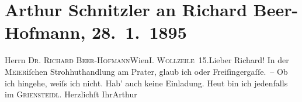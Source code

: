 

         
         \renewcommand{\erwaehntePersonen}{Personen: Richard Beer-Hofmann}
         \renewcommand{\erwaehnteInstitutionen}{Institutionen: I. Mayer Strohhüte}
         \renewcommand{\erwaehnteOrte}{Orte: Café Griensteidl, Freisingergasse, I., Innere Stadt, IX., Alsergrund, Prater, Wien, Wollzeile}
         \renewcommand{\erwaehnteWerke}{}
               \section[Arthur Schnitzler an Richard Beer-Hofmann, 28. 1. 1895]{ Arthur Schnitzler an Richard Beer-Hofmann, 28. 1. 1895}\nopagebreak{}\rehead{ }\begin{ledgroupsized}[t]{13cm}\normalsize\beginnumbering \toendnotes[C]{\smallbreak\pagebreak[2]} 
\pstart{}{\pb}Herrn \textsc{Dr. Richard
                     Beer-Hofmann}\pend{}\pstart{}Wien\pend{}\pstart{}\textsc{I. Wollzeile 15}.\pend{}{\bigskip}\pstart{}{\pb}Lieber Richard!\pend\pstart
           In der \textsc{Meier}iſchen Strohhuthandlung am Prater, glaub ich oder Freiſingergaſſe. –\pend
           \pstart
           Ob ich hingehe, weiſs ich nicht. Hab’ auch keine Einladung. Heut bin ich jedenfalls
               im \textsc{Griensteidl}.\pend
           \pstart Herzlichſt Ihr\spacefill\mbox{Arthur}\pend{}
         
         \endnumbering{}\end{ledgroupsized}  \newcommand{\dateiname}{L00417}\newcommand{\titel}{Arthur Schnitzler an Richard Beer-Hofmann, 28. 1. 1895}\newcommand{\editorInnen}{Martin Anton Müller und Gerd-Hermann Susen}
      